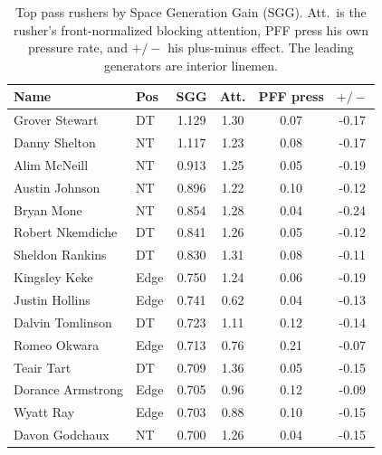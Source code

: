 \begin{table}[h!]
\centering
\footnotesize
\begin{tabular}{llcccc}
\toprule
Name & Pos & SGG & Att. & PFF press & $+/-$ \\
\midrule
Grover Stewart & DT & 1.129 & 1.30 & 0.07 & -0.17 \\
Danny Shelton & NT & 1.117 & 1.23 & 0.08 & -0.17 \\
Alim McNeill & NT & 0.913 & 1.25 & 0.05 & -0.19 \\
Austin Johnson & NT & 0.896 & 1.22 & 0.10 & -0.12 \\
Bryan Mone & NT & 0.854 & 1.28 & 0.04 & -0.24 \\
Robert Nkemdiche & DT & 0.841 & 1.26 & 0.05 & -0.12 \\
Sheldon Rankins & DT & 0.830 & 1.31 & 0.08 & -0.11 \\
Kingsley Keke & Edge & 0.750 & 1.24 & 0.06 & -0.19 \\
Justin Hollins & Edge & 0.741 & 0.62 & 0.04 & -0.13 \\
Dalvin Tomlinson & DT & 0.723 & 1.11 & 0.12 & -0.14 \\
Romeo Okwara & Edge & 0.713 & 0.76 & 0.21 & -0.07 \\
Teair Tart & DT & 0.709 & 1.36 & 0.05 & -0.15 \\
Dorance Armstrong & Edge & 0.705 & 0.96 & 0.12 & -0.09 \\
Wyatt Ray & Edge & 0.703 & 0.88 & 0.10 & -0.15 \\
Davon Godchaux & NT & 0.700 & 1.26 & 0.04 & -0.15 \\
\bottomrule
\end{tabular}
\caption{Top pass rushers by Space Generation Gain (SGG). Att.\ is the rusher's front-normalized blocking attention, PFF press his own pressure rate, and $+/-$ his plus-minus effect. The leading generators are interior linemen.}
\label{tab:pocket_sgg}
\end{table}
